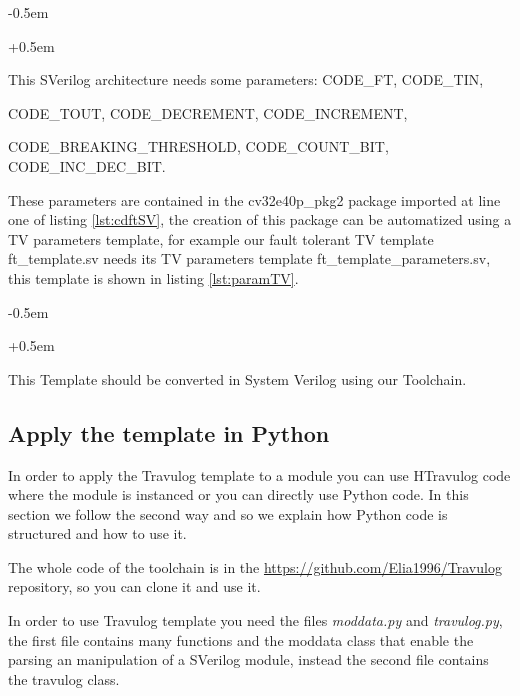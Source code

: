 {{{    		\openup -0.5em
    	
        	
        	
    		\openup +0.5em
    		
    		This SVerilog architecture needs some parameters: CODE\_FT, CODE\_TIN,
    		
    		CODE\_TOUT,  CODE\_DECREMENT,  CODE\_INCREMENT,     
    		
    		CODE\_BREAKING\_THRESHOLD,     
    		CODE\_COUNT\_BIT, CODE\_INC\_DEC\_BIT. 
    		
    		These parameters are contained in the cv32e40p\_pkg2 package imported at line one of listing \ref{lst:cdftSV}, the creation of this package can be automatized using a TV parameters template, for example our fault tolerant TV template ft\_template.sv needs its TV parameters template ft\_template\_parameters.sv, this template is shown in listing \ref{lst:paramTV}.
    		
    		
    		\openup -0.5em
    	
        	
        	
    		\openup +0.5em
    		
    		This Template should be converted in System Verilog using our Toolchain.
    		
    		
    	}%
    	
    	\subsection{Apply the template in Python}{
            In order to apply the Travulog template to a module you can use HTravulog code where the module is instanced or you can directly use Python code. In this section we follow the second way and so we explain how Python code is structured and how to use it.
            
            The whole code of the toolchain is in the \url{https://github.com/Elia1996/Travulog} repository, so you can clone it and use it. 
            
            In order to use Travulog template you need the files \textit{moddata.py} and \textit{travulog.py}, the first file contains many functions and the moddata class that enable the parsing an manipulation of a SVerilog module, instead the second file contains the travulog class.
            
}}}
